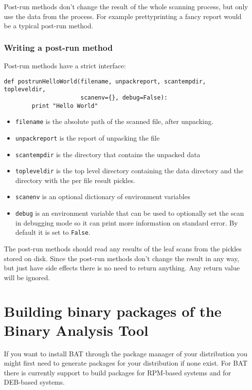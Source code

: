 \documentclass[10pt,a4paper]{article}
\begin{document}
Post-run methods don't change the result of the whole scanning process, but
only use the data from the process. For example prettyprinting a fancy report
would be a typical post-run method.

\subsubsection{Writing a post-run method}

Post-run methods have a strict interface:

\begin{verbatim}
def postrunHelloWorld(filename, unpackreport, scantempdir, topleveldir,
                      scanenv={}, debug=False):
        print "Hello World"
\end{verbatim}

\begin{itemize}
\item \texttt{filename} is the absolute path of the scanned file, after
unpacking.
\item \texttt{unpackreport} is the report of unpacking the file
\item \texttt{scantempdir} is the directory that contains the unpacked data
\item \texttt{topleveldir} is the top level directory containing the data
directory and the directory with the per file result pickles.
\item \texttt{scanenv} is an optional dictionary of environment variables
\item \texttt{debug} is an environment variable that can be used to optionally
set the scan in debugging mode so it can print more information on standard
error. By default it is set to \texttt{False}.
\end{itemize}

The post-run methods should read any results of the leaf scans from the pickles
stored on disk. Since the post-run methods don't change the result in any way,
but just have side effects there is no need to return anything. Any return value
will be ignored.

\section{Building binary packages of the Binary Analysis Tool}

If you want to install BAT through the package manager of your distribution you
might first need to generate packages for your distribution if none exist. For
BAT there is currently support to build packages for RPM-based systems and for
DEB-based systems.
\end{document}
